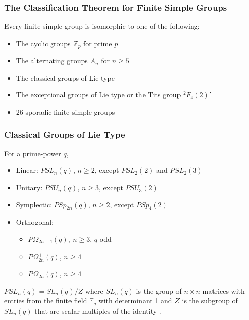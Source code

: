 \documentclass{beamer}
\begin{document}
\begin{frame}
	\frametitle{The Classification Theorem for Finite Simple Groups \cite{wilson}}
	\begin{theorem}
	Every finite simple group is isomorphic to one of the following:
	\begin{itemize}
	\item
	The cyclic groups $\mathbb{Z}_p$ for prime $p$
	\item
	The alternating groups $A_n$ for $n \ge 5$
	\item
	The classical groups of Lie type
	\item
	The exceptional groups of Lie type or the Tits group ${}^2F_4(2)'$
	\item
	26 sporadic finite simple groups		
	\end{itemize}
	\end{theorem}
\end{frame}

\begin{frame}
	\frametitle{Classical Groups of Lie Type}
	For a prime-power $q$,
		\begin{itemize}
		\item
		Linear: $PSL_n(q)$, $n \ge 2$, except $PSL_2(2)$ and $PSL_2(3)$
		\item
		Unitary: $PSU_n(q)$, $n \ge 3$, except $PSU_3(2)$
		\item
		Symplectic: $PSp_{2n}(q)$, $n \ge 2$, except $PSp_4(2)$
		\item
		Orthogonal:
		\begin{itemize}
			\item
			$P\Omega_{2n+1}(q)$, $n \ge 3$, $q$ odd
			\item
			$P\Omega^+_{2n}(q)$, $n \ge 4$
			\item
			$P\Omega^-_{2n}(q)$, $n \ge 4$
		\end{itemize}
	\end{itemize}
	\begin{example}
		$PSL_n(q) = SL_n(q) / Z$ where $SL_n(q)$ is the group of $n \times n$ matrices with entries from the finite field $\mathbb{F}_q$ with determinant 1 and $Z$ is the subgroup of $SL_n(q)$ that are scalar multiples of the identity \cite{wilson}.
	\end{example}
\end{frame}
\end{document}
